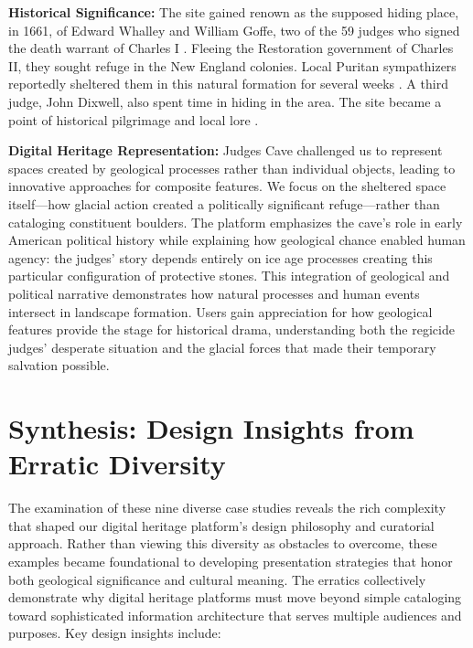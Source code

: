 \textbf{Historical Significance:} The site gained renown as the supposed hiding place, in 1661, of Edward Whalley and William Goffe, two of the 59 judges who signed the death warrant of Charles I \cite{Stiles1794, onlyinyourstateLearnFascinating}. Fleeing the Restoration government of Charles II, they sought refuge in the New England colonies. Local Puritan sympathizers reportedly sheltered them in this natural formation for several weeks \cite{Stiles1794}. A third judge, John Dixwell, also spent time in hiding in the area. The site became a point of historical pilgrimage and local lore \cite{onlyinyourstateLearnFascinating}.

\textbf{Digital Heritage Representation:} Judges Cave challenged us to represent spaces created by geological processes rather than individual objects, leading to innovative approaches for composite features. We focus on the sheltered space itself—how glacial action created a politically significant refuge—rather than cataloging constituent boulders. The platform emphasizes the cave's role in early American political history while explaining how geological chance enabled human agency: the judges' story depends entirely on ice age processes creating this particular configuration of protective stones. This integration of geological and political narrative demonstrates how natural processes and human events intersect in landscape formation. Users gain appreciation for how geological features provide the stage for historical drama, understanding both the regicide judges' desperate situation and the glacial forces that made their temporary salvation possible.

\section{Synthesis: Design Insights from Erratic Diversity}
\label{sec:synthesis}

The examination of these nine diverse case studies reveals the rich complexity that shaped our digital heritage platform's design philosophy and curatorial approach. Rather than viewing this diversity as obstacles to overcome, these examples became foundational to developing presentation strategies that honor both geological significance and cultural meaning. The erratics collectively demonstrate why digital heritage platforms must move beyond simple cataloging toward sophisticated information architecture that serves multiple audiences and purposes. Key design insights include:


